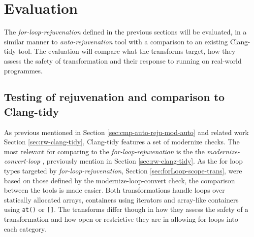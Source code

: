 \documentclass[bsc,frontabs,singlespacing,twoside,parskip,deptreport]{infthesis}
\begin{document}

\section{Evaluation}\label{sec:eval-for-loop}

The \textit{for-loop-rejuvenation} defined in the previous sections will be evaluated, in a similar manner to \textit{auto-rejuvenation} tool with a comparison to an existing Clang-tidy tool. The evaluation will compare what the transforms target, how they assess the safety of transformation and their response to running on real-world programmes.   

\subsection{Testing of rejuvenation and comparison to Clang-tidy}\label{sec:cmp-to-clang-for}

As previous mentioned in Section \ref{sec:cmp-auto-reju-mod-auto} and related work Section \ref{sec:rw-clang-tidy}, Clang-tidy features a set of modernize checks. The most relevant for comparing to the \textit{for-loop-rejuvenation} is the the \textit{modernize-convert-loop} \cite{FOR_CONVERT}, previously mention in Section \ref{sec:rw-clang-tidy}. As the for loop types targeted by \textit{for-loop-rejuvenation}, Section \ref{sec:forLoop-scope-trans}, were based on those defined by the modernize-loop-convert check, the comparison between the tools is made easier. Both transformations handle loops over statically allocated arrays, containers using iterators and array-like containers using \texttt{at()} or \texttt{[]}. The transforms differ though in how they assess the safety of a transformation and how open or restrictive they are in allowing for-loops into each category. 
\end{document}
